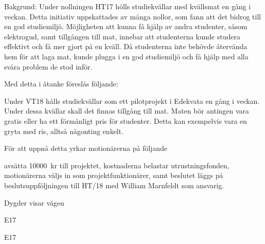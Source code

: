 \documentclass[../_main/handlingar.tex]{subfiles}
\begin{document}
Bakgrund: Under nollningen HT17 hölls studiekvällar med kvällsmat en gång i veckan. Detta initiativ uppskattades av många nollor, som fann att det bidrog till en god studiemiljö. Möjligheten att kunna få hjälp av andra studenter, såsom elektrogud, samt tillgången till mat, innebar att studenterna
kunde studera effektivt och få mer gjort på en kväll. Då studenterna inte behövde återvända hem för att laga mat, kunde plugga i en god studiemiljö och få hjälp med alla svåra problem de stod inför.

Med detta i åtanke föreslås följande:

Under VT18 hålls studiekvällar som ett pilotprojekt i Edekvata en gång i veckan. Under dessa kvällar skall det finnas tillgång till mat. Maten bör antingen vara gratis eller ha ett förmånligt pris för
studenter. Detta kan exempelvis vara en gryta med ris, alltså någonting enkelt.

För att uppnå detta yrkar motionärerna på följande

\begin{attsatser}
  \att avsätta \SI{10000}{kr} till projektet,
  \att kostnaderna belastar utrustningsfonden,
  \att motionärerna väljs in som projektfunktionärer, samt
  \att beslutet läggs på beslutsuppföljningen till HT/18 med William Marnfeldt som ansvarig.
\end{attsatser}

\begin{signatures}{2}
    Dygder visar vägen
    \signature{William Marnfeldt}{E17}
    \signature{Filip Larsson}{E17}
\end{signatures}
\end{document}
